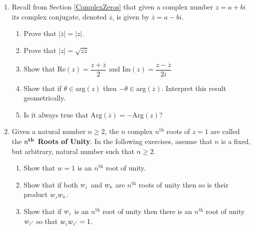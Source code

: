 \begin{enumerate}
\item Recall from Section \ref{ComplexZeros} that given a complex number $z = a+bi$ its complex conjugate, denoted $\overline{z}$, is given by $\overline{z} = a - bi$.

\begin{enumerate}

\item Prove that $\left| \overline{z} \right| = |z|$.

\item Prove that $|z| = \sqrt{z \overline{z}}$

\item Show that $\text{Re}(z) = \dfrac{z + \overline{z}}{2}$ and $\text{Im}(z) = \dfrac{z - \overline{z}}{2i}$

\item Show that if $\theta \in \text{arg}(z)$ then $-\theta \in \text{arg}\left(\overline{z}\right)$. Interpret this result geometrically.

\item Is it always true that $\text{Arg}\left(\overline{z}\right) = -\text{Arg}(z)$?

\end{enumerate}

\item Given a natural number $n \geq 2$, the $n$ complex $n^{\text{th}}$ roots of  $z = 1$ are called the \textbf{\boldmath $n^{\mbox{\textbf{\scriptsize th}}}$ Roots of Unity}.    In the following exercises, assume that $n$ is a fixed, but arbitrary, natural number such that $n \geq 2$.

\begin{enumerate}

\item Show that $w = 1$ is an $n^{\text{th}}$ root of unity.

\item Show that if both $w_{\text{\tiny$j$}}$ and $w_{\text{\tiny$k$}}$ are $n^{\text{th}}$ roots of unity then so is their product $w_{\text{\tiny$j$}}w_{\text{\tiny$k$}}$.

\item Show that if $w_{\text{\tiny$j$}}$ is an $n^{\text{th}}$ root of unity then there is an $n^{\text{th}}$ root of unity $w_{\text{\tiny$j'$}}$  so that  $w_{\text{\tiny$j$}}w_{\text{\tiny$j'$}} = 1$. 

\smallskip


\end{enumerate}
\end{enumerate}

